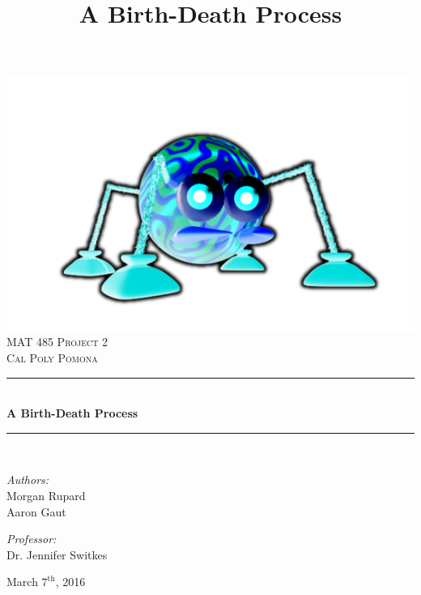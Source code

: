 \documentclass[11pt, oneside]{article}   	%
\title{A Birth-Death Process}
\newcommand{\HRule}{\rule{\linewidth}{0.5mm}}
\begin{document}
\frenchspacing
\begin{titlepage}
		\begin{center}
			\includegraphics[scale=0.2]{logo}\\[1cm]

			\textsc{\LARGE MAT 485 Project 2}\\[2cm]
			\textsc{\Large Cal Poly Pomona}\\[1cm]


			\HRule \\[0.4cm]
			{\huge \bfseries A Birth-Death Process \\[0.4cm]}
			\HRule \\[2cm]

			\noindent
			\begin{minipage}{0.4\textwidth}
				\begin{flushleft}
					\large
					\emph{Authors:}\\
					Morgan Rupard \\ Aaron Gaut
				\end{flushleft}
			\end{minipage}
			\begin{minipage}{0.4\textwidth}
				\begin{flushright}
					\large
					\emph{Professor:}\\
					Dr. Jennifer Switkes
			\end{flushright}
			\end{minipage}

			\vfill

			{\large March $7^{\text{th}}$, 2016}
		\end{center}
	\end{titlepage}

\tableofcontents
\newpage
\end{document}
